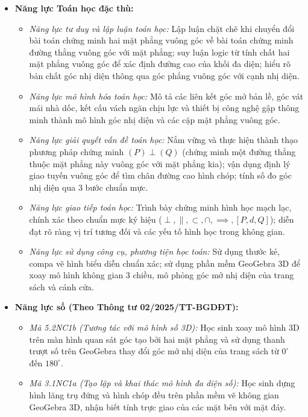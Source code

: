 \documentclass[12pt, a4paper]{article}
\begin{document}
\begin{itemize}[leftmargin=1.2cm]
    \item \textbf{Năng lực Toán học đặc thù:}
    \begin{itemize}[leftmargin=0.6cm]
        \item \textit{Năng lực tư duy và lập luận toán học:} Lập luận chặt chẽ khi chuyển đổi bài toán chứng minh hai mặt phẳng vuông góc về bài toán chứng minh đường thẳng vuông góc với mặt phẳng; suy luận logic từ tính chất hai mặt phẳng vuông góc để xác định đường cao của khối đa diện; hiểu rõ bản chất góc nhị diện thông qua góc phẳng vuông góc với cạnh nhị diện.
        \item \textit{Năng lực mô hình hóa toán học:} Mô tả các liên kết góc mở bản lề, góc vát mái nhà dốc, kết cấu vách ngăn chịu lực và thiết bị công nghệ gập thông minh thành mô hình góc nhị diện và các cặp mặt phẳng vuông góc.
        \item \textit{Năng lực giải quyết vấn đề toán học:} Nắm vững và thực hiện thành thạo phương pháp chứng minh $(P) \perp (Q)$ (chứng minh một đường thẳng thuộc mặt phẳng này vuông góc với mặt phẳng kia); vận dụng định lý giao tuyến vuông góc để tìm chân đường cao hình chóp; tính số đo góc nhị diện qua 3 bước chuẩn mực.
        \item \textit{Năng lực giao tiếp toán học:} Trình bày chứng minh hình học mạch lạc, chính xác theo chuẩn mực ký hiệu ($\perp, \parallel, \subset, \cap, \implies, [P, d, Q]$); diễn đạt rõ ràng vị trí tương đối và các yếu tố hình học trong không gian.
        \item \textit{Năng lực sử dụng công cụ, phương tiện học toán:} Sử dụng thước kẻ, compa vẽ hình biểu diễn chuẩn xác; sử dụng phần mềm GeoGebra 3D để xoay mô hình không gian 3 chiều, mô phỏng góc mở nhị diện của trang sách và cánh cửa.
    \end{itemize}

    \item \textbf{Năng lực số (Theo Thông tư 02/2025/TT-BGDĐT):}
    \begin{itemize}[leftmargin=0.6cm]
        \item \textit{Mã 5.2NC1b (Tương tác với mô hình số 3D):} Học sinh xoay mô hình 3D trên màn hình quan sát góc tạo bởi hai mặt phẳng và sử dụng thanh trượt số trên GeoGebra thay đổi góc mở nhị diện của trang sách từ $0^\circ$ đến $180^\circ$.
        \item \textit{Mã 3.1NC1a (Tạo lập và khai thác mô hình đa diện số):} Học sinh dựng hình lăng trụ đứng và hình chóp đều trên phần mềm vẽ không gian GeoGebra 3D, nhận biết tính trực giao của các mặt bên với mặt đáy.
    \end{itemize}


\end{itemize}
\end{document}
